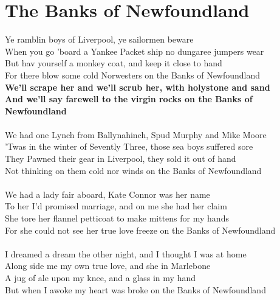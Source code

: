 \documentclass[letterpaper,9pt]{article}
\begin{document}
\newpage
\section{The Banks of Newfoundland}
\Large
\noindent
Ye ramblin boys of Liverpool, ye sailormen beware
\\When you go 'board a Yankee Packet ship no dungaree jumpers wear
\\But hav yourself a monkey coat, and keep it close to hand
\\For there blow some cold Norwesters on the Banks of Newfoundland
\\\textbf{We'll scrape her and we'll scrub her, with holystone and sand
\\And we'll say farewell to the virgin rocks on the Banks of Newfoundland}
\\
\\We had one Lynch from Ballynahinch, Spud Murphy and Mike Moore
\\'Twas in the winter of Sevently Three, those sea boys suffered sore
\\They Pawned their gear in Liverpool, they sold it out of hand
\\Not thinking on them cold nor winds on the Banks of Newfoundland
\\
\\We had a lady fair aboard, Kate Connor was her name
\\To her I'd promised marriage, and on me she had her claim
\\She tore her flannel petticoat to make mittens for my hands
\\For she could not see her true love freeze on the Banks of Newfoundland
\\
\\I dreamed a dream the other night, and I thought I was at home
\\Along side me my own true love, and she in Marlebone
\\A jug of ale upon my knee, and a glass in my hand
\\But when I awoke my heart was broke on the Banks of Newfoundland

\newpage
\end{document}
